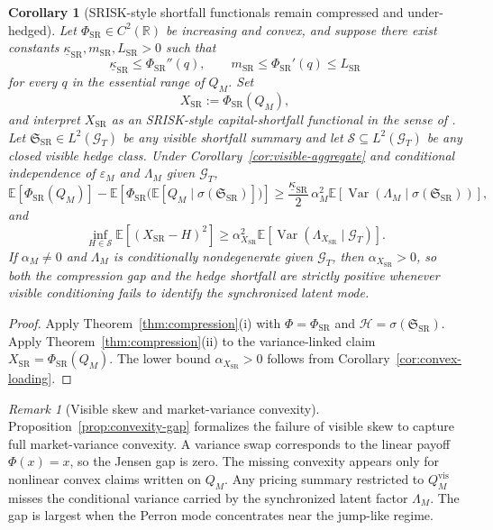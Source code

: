 \documentclass[11pt,a4paper]{amsart}
\theoremstyle{plain}
\newtheorem{corollary}[theorem]{Corollary}
\theoremstyle{definition}
\theoremstyle{remark}
\newtheorem{remark}[theorem]{Remark}
\DeclareMathOperator{\Var}{Var}
\newcommand{\R}{\mathbb{R}}
\newcommand{\EE}{\mathbb{E}}
\newcommand{\cH}{\mathcal{H}}
\newcommand{\cG}{\mathcal{G}}
\begin{document}
\begin{corollary}[SRISK-style shortfall functionals remain compressed and under-hedged]\label{cor:srisk}
Let \(\Phi_{\mathrm{SR}}\in C^2(\R)\) be increasing and convex, and suppose there exist constants
\(\underline\kappa_{\mathrm{SR}},m_{\mathrm{SR}},L_{\mathrm{SR}}>0\) such that
\[
        \underline\kappa_{\mathrm{SR}}
        \le
        \Phi_{\mathrm{SR}}''(q),
        \qquad
        m_{\mathrm{SR}}
        \le
        \Phi_{\mathrm{SR}}'(q)
        \le
        L_{\mathrm{SR}}
\]
for every \(q\) in the essential range of \(Q_M\).  Set
\[
        X_{\mathrm{SR}}:=\Phi_{\mathrm{SR}}(Q_M),
\]
and interpret \(X_{\mathrm{SR}}\) as an SRISK-style capital-shortfall functional in the sense of
\cite{brownlees2017srisk}.  Let \(\mathfrak S_{\mathrm{SR}}\in L^2(\cG_T)\) be any visible
shortfall summary and let \(\mathcal S\subseteq L^2(\cG_T)\) be any closed visible hedge class.
Under Corollary~\ref{cor:visible-aggregate} and conditional independence of \(\varepsilon_M\) and
\(\Lambda_M\) given \(\cG_T\),
\[
        \EE[\Phi_{\mathrm{SR}}(Q_M)]
        -
        \EE\!\left[\Phi_{\mathrm{SR}}\!\bigl(\EE[Q_M\mid \sigma(\mathfrak S_{\mathrm{SR}})]\bigr)\right]
        \ge
        \frac{\underline\kappa_{\mathrm{SR}}}{2}\,
        \alpha_M^2
        \EE\!\left[\Var(\Lambda_M\mid \sigma(\mathfrak S_{\mathrm{SR}}))\right],
\]
and
\[
        \inf_{H\in \mathcal S}\EE[(X_{\mathrm{SR}}-H)^2]
        \ge
        \alpha_{X_{\mathrm{SR}}}^2
        \EE\!\left[\Var(\Lambda_{X_{\mathrm{SR}}}\mid \cG_T)\right].
\]
If \(\alpha_M\neq0\) and \(\Lambda_M\) is conditionally nondegenerate given \(\cG_T\), then
\(\alpha_{X_{\mathrm{SR}}}>0\), so both the compression gap and the hedge shortfall are strictly
positive whenever visible conditioning fails to identify the synchronized latent mode.
\end{corollary}

\begin{proof}
Apply Theorem~\ref{thm:compression}(i) with \(\Phi=\Phi_{\mathrm{SR}}\) and
\(\cH=\sigma(\mathfrak S_{\mathrm{SR}})\).  Apply Theorem~\ref{thm:compression}(ii) to the
variance-linked claim \(X_{\mathrm{SR}}=\Phi_{\mathrm{SR}}(Q_M)\).  The lower bound
\(\alpha_{X_{\mathrm{SR}}}>0\) follows from Corollary~\ref{cor:convex-loading}.
\end{proof}

\begin{remark}[Visible skew and market-variance convexity]
Proposition~\ref{prop:convexity-gap} formalizes the failure of visible skew to capture full
market-variance convexity.  A variance swap corresponds to the linear payoff \(\Phi(x)=x\), so the
Jensen gap is zero.  The missing convexity appears only for nonlinear convex claims written on
\(Q_M\).  Any pricing summary restricted to \(Q_M^{\mathrm{vis}}\) misses the
conditional variance carried by the synchronized latent factor \(\Lambda_M\).  The gap is largest
when the Perron mode concentrates near the jump-like regime.
\end{remark}
\end{document}
